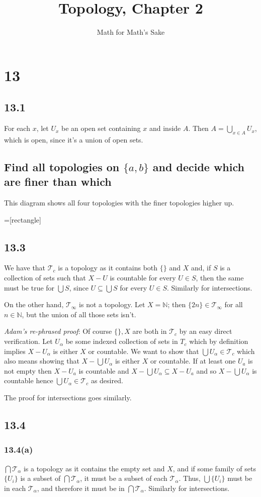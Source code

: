 \documentclass{article}
\title{Topology, Chapter 2}
\author{Math for Math's Sake}
\newcommand\s{\section*}
\renewcommand\ss{\subsection*}
\newcommand\sss{\subsubsection*}
\begin{document}
\maketitle
\s{13}
\ss{13.1}
For each $x$, let $U_x$ be an open set containing $x$ and inside $A$.  Then $A =
\bigcup_{x\in A}U_x$, which is open, since it's a union of open sets.
\ss{Find all topologies on $\{a,b\}$ and decide which are finer than which}
This diagram shows all four topologies with the finer topologies higher up.
\begin{center}
  =[rectangle]
\end{center}
\ss{13.3}
We have that $\mathcal{T}_c$ is a topology as it contains both $\{\}$ and $X$ and, if $S$ is a collection of sets such that $X-U$ is countable for every $U\in S$, then the same must be true for $\bigcup S$, since $U\subseteq\bigcup S$ for every $U\in S$.  Similarly for intersections.

On the other hand, $\mathcal{T}_\infty$ is not a topology.  Let $X=\mathbb{N}$; then $\{2n\}\in\mathcal{T}_\infty$ for all $n\in\mathbb{N}$, but the union of all those sets isn't.

{\it Adam's re-phrased proof}:  Of course $\{\}, X$ are both in $\mathcal{T}_c$ by an easy direct verification.  Let $U_\alpha$ be some indexed collection of sets in $T_c$ which by definition implies $X-U_\alpha$ is either $X$ or countable.  We want to show that $\bigcup U_\alpha\in \mathcal{T}_c$ which also means showing that $X-\bigcup U_\alpha$ is either $X$ or countable.  If at least one $U_a$ is not empty then $X-U_a$ is countable and $X-\bigcup U_\alpha \subseteq X-U_a$ and so $X-\bigcup U_\alpha$ is countable hence $\bigcup U_\alpha\in \mathcal{T}_c$ as desired.  

The proof for intersections goes similarly.  

\ss{13.4}
\sss{13.4(a)}
$\bigcap\mathcal{T}_\alpha$ is a topology as it contains the empty set and $X$, and if some family of sets $\{U_i\}$ is a subset of $\bigcap\mathcal{T}_\alpha$, it must be a subset of each $\mathcal{T}_\alpha$.  Thus, $\bigcup\{U_i\}$ must be in each $\mathcal{T}_\alpha$, and therefore it must be in $\bigcap\mathcal{T}_\alpha$.  Similarly for intersections.
\end{document}
